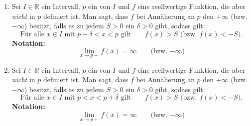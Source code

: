 \begin{enumerate}[leftmargin=*]
    \item Sei $I \in \mathbb{R}$ ein Intervall, $p$ ein  von $I$ und $f$ eine reellwertige Funktion, die aber \textit{nicht} in $p$ definiert ist. Man sagt, dass $f$ bei Annäherung an $p$ den  $+\infty$ (bzw. $-\infty$) besitzt, falls es zu jedem $S > 0$ ein $\delta > 0$ gibt, sodass gilt:
    $$\text{Für alle $x \in I$ mit $p - \delta  < x < p$ gilt} \qquad f(x) > S \text{ (bzw. $f(x) < -S$).}$$
    \textbf{Notation:} $$\lim_{x \to p-} f(x) = \infty \qquad \text{(bzw. $-\infty$)}$$
    \item Sei $I \in \mathbb{R}$ ein Intervall, $p$ ein  von $I$ und $f$ eine reellwertige Funktion, die aber \textit{nicht} in $p$ definiert ist. Man sagt, dass $f$ bei Annäherung an $p$ den  $+\infty$ (bzw. $-\infty$) besitzt, falls es zu jedem $S > 0$ ein $\delta > 0$ gibt, sodass gilt:
    $$\text{Für alle $x \in I$ mit $p < x < p + \delta$ gilt} \qquad f(x) > S \text{ (bzw. $f(x) < -S$).}$$
    \textbf{Notation:} $$\lim_{x \to p+} f(x) = \infty \qquad \text{(bzw. $-\infty$)}$$
\end{enumerate}
